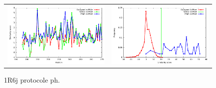 \documentclass[a4paper,12pt]{article}
\begin{document}
   \begin{figure}[t]
     \centering
     \begin{tabular}{cc}
       \includegraphics[width=8.45cm]{gen_08032012/1R6J/ph/similarity_bypos.pdf} &
       \includegraphics[width=8.45cm]{gen_08032012/1R6J/ph/similarity_byseq_frequency.pdf} \\
     \end{tabular}
     
     \caption{1R6j protocole ph.}
     \label{1R6J}
   \end{figure}
\end{document}

